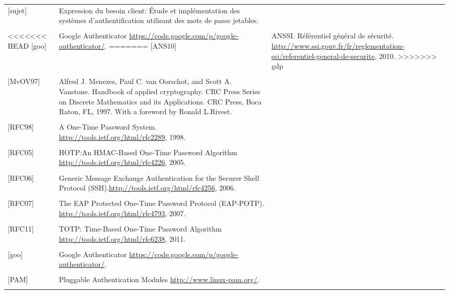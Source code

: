 \documentclass{"../../res/univ-projet"}
\begin{document}
\begin{tabular}{p{}>{\raggedright\arraybackslash}p{13cm}}
{\label{[sujet]}[sujet]} & {Expression du besoin client: Étude et implémentation des systèmes d'authentification utilisant des mots de passe jetables.}
\tabularnewline
\\
<<<<<<< HEAD
{[goo]} & {Google Authenticator \href{https://code.google.com/p/google-authenticator/}{https://code.google.com/p/google-authenticator/}.}
=======
{\label{[ANS10]}[ANS10]} & {ANSSI. Référentiel général de sécurité. \href{http://www.ssi.gouv.fr/fr/reglementation-ssi/referentiel-general-de-securite}{http://www.ssi.gouv.fr/fr/reglementation-ssi/referentiel-general-de-securite}, 2010.}
>>>>>>> gdp
\tabularnewline
\\
{\label{[MvOV97]}[MvOV97]} & {Alfred J. Menezes, Paul C. van Oorschot, and Scott A. Vanstone. Handbook of applied cryptography. CRC Press Series on Discrete Mathematics and its Applications. CRC Press, Boca Raton, FL, 1997. With a foreword by Ronald L.Rivest.}
\tabularnewline
\\
{\label{[RFC98]}[RFC98]} & {A One-Time Password System. \href{http://tools.ietf.org/html/rfc2289}{http://tools.ietf.org/html/rfc2289}, 1998.}
\tabularnewline
\\
{\label{[RFC05]}[RFC05]} & {HOTP:An HMAC-Based One-Time Password Algorithm \href{http://tools.ietf.org/html/rfc4226}{http://tools.ietf.org/html/rfc4226}, 2005.}
\tabularnewline
\\
{\label{[RFC06]}[RFC06]} & {Generic Message Exchange Authentication for the Securer Shell Protocol (SSH).\href{http://tools.ietf.org/html/rfc4256}{http://tools.ietf.org/html/rfc4256}, 2006.}
\tabularnewline
\\
{\label{[RFC07]}[RFC07]} & {The EAP Protected One-Time Password Protocol (EAP-POTP). \href{http://tools.ietf.org/html/rfc4793}{http://tools.ietf.org/html/rfc4793}, 2007.}
\tabularnewline
\\
{\label{[RFC11]}[RFC11]} & {TOTP: Time-Based One-Time Password Algorithm \href{http://tools.ietf.org/html/rfc6238}{http://tools.ietf.org/html/rfc6238}, 2011.}
\tabularnewline
\\
{\label{[goo]}[goo]} & {Google Authenticator \href{https://code.google.com/p/google-authenticator/}{https://code.google.com/p/google-authenticator/}.}
\tabularnewline
\\
{\label{[PAM]}[PAM]} & {Pluggable Authentication Modules \href{http://www.linux-pam.org/}{http://www.linux-pam.org/}.}
\tabularnewline
\\
\end{tabular}
\end{document}
